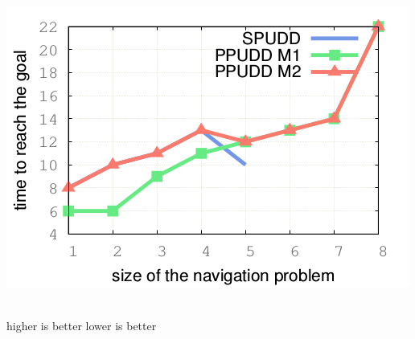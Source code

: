 \documentclass[12pt,svgnames,table]{beamer}
\begin{document}
\begin{frame}
{\begin{minipage}{0.45\linewidth}
 \\
\includegraphics[scale=0.4]{courbePerfMDP2.png} 
\end{minipage}\\
\vspace{0.3cm} 
\hspace{1.2cm} {\color{gggreen} higher is better} \hspace{2.8cm} {\color{gggreen} lower is better}
}
\end{frame}
\end{document}
